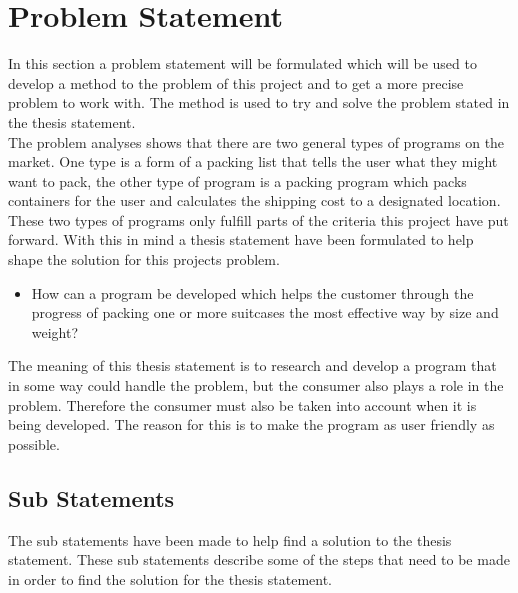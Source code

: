 \section{Problem Statement}
\label{sec:thesis}
In this section a problem statement will be formulated which will be used to develop a method to the problem of this project and to get a more precise problem to work with. The method is used to try and solve the problem stated in the thesis statement.\\
The problem analyses shows that there are two general types of programs on the market. One type is a form of a packing list that tells the user what they might want to pack, the other type of program is a packing program which packs containers for the user and calculates the shipping cost to a designated location. These two types of programs only fulfill parts of the criteria this project have put forward. With this in mind a thesis statement have been formulated to help shape the solution for this projects problem.

\begin{itemize}
\item How can a program be developed which helps the customer through the progress of packing one or more suitcases the most effective way by size and weight?
\end{itemize}

The meaning of this thesis statement is to research and develop a program that in some way could handle the problem, but the consumer also plays a role in the problem.
Therefore the consumer must also be taken into account when it is being developed. The reason for this is to make the program as user friendly as possible.

\subsection*{Sub Statements}
The sub statements have been made to help find a solution to the thesis statement. These sub statements describe some of the steps that need to be made in order to find the solution for the thesis statement.


